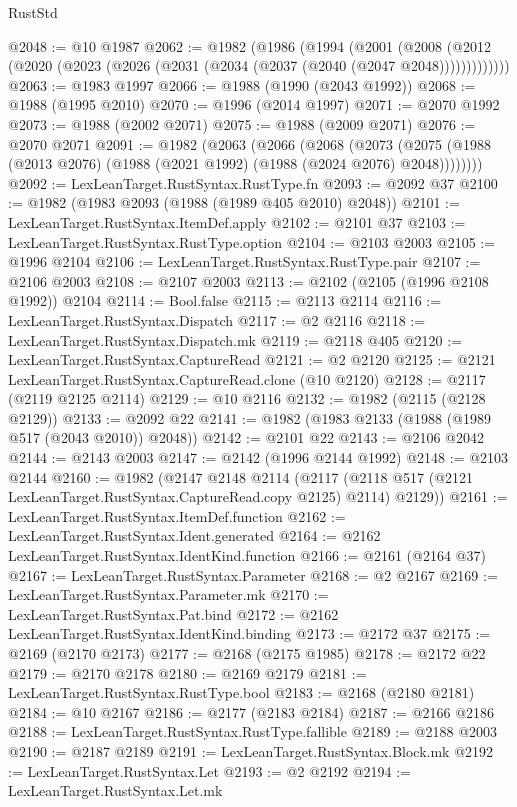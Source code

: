 \begin{lexlean}{RustStd}
\begin{coremodule}
{\begin{coremodule}
{{{{{{{{{{{{{{{{{{{{{{{{{{@2048 := @10 @1987
@2062 := @1982
    (@1986
      (@1994
        (@2001
          (@2008 (@2012 (@2020 (@2023 (@2026 (@2031 (@2034 (@2037 (@2040 (@2047 @2048)))))))))))))
@2063 := @1983 @1997
@2066 := @1988 (@1990 (@2043 @1992))
@2068 := @1988 (@1995 @2010)
@2070 := @1996 (@2014 @1997)
@2071 := @2070 @1992
@2073 := @1988 (@2002 @2071)
@2075 := @1988 (@2009 @2071)
@2076 := @2070 @2071
@2091 := @1982
    (@2063
      (@2066
        (@2068
          (@2073 (@2075 (@1988 (@2013 @2076) (@1988 (@2021 @1992) (@1988 (@2024 @2076) @2048))))))))
@2092 := LexLeanTarget.RustSyntax.RustType.fn
@2093 := @2092 @37
@2100 := @1982 (@1983 @2093 (@1988 (@1989 @405 @2010) @2048))
@2101 := LexLeanTarget.RustSyntax.ItemDef.apply
@2102 := @2101 @37
@2103 := LexLeanTarget.RustSyntax.RustType.option
@2104 := @2103 @2003
@2105 := @1996 @2104
@2106 := LexLeanTarget.RustSyntax.RustType.pair
@2107 := @2106 @2003
@2108 := @2107 @2003
@2113 := @2102 (@2105 (@1996 @2108 @1992)) @2104
@2114 := Bool.false
@2115 := @2113 @2114
@2116 := LexLeanTarget.RustSyntax.Dispatch
@2117 := @2 @2116
@2118 := LexLeanTarget.RustSyntax.Dispatch.mk
@2119 := @2118 @405
@2120 := LexLeanTarget.RustSyntax.CaptureRead
@2121 := @2 @2120
@2125 := @2121 LexLeanTarget.RustSyntax.CaptureRead.clone (@10 @2120)
@2128 := @2117 (@2119 @2125 @2114)
@2129 := @10 @2116
@2132 := @1982 (@2115 (@2128 @2129))
@2133 := @2092 @22
@2141 := @1982 (@1983 @2133 (@1988 (@1989 @517 (@2043 @2010)) @2048))
@2142 := @2101 @22
@2143 := @2106 @2042
@2144 := @2143 @2003
@2147 := @2142 (@1996 @2144 @1992)
@2148 := @2103 @2144
@2160 := @1982
    (@2147
      @2148
      @2114
      (@2117 (@2118 @517 (@2121 LexLeanTarget.RustSyntax.CaptureRead.copy @2125) @2114) @2129))
@2161 := LexLeanTarget.RustSyntax.ItemDef.function
@2162 := LexLeanTarget.RustSyntax.Ident.generated
@2164 := @2162 LexLeanTarget.RustSyntax.IdentKind.function
@2166 := @2161 (@2164 @37)
@2167 := LexLeanTarget.RustSyntax.Parameter
@2168 := @2 @2167
@2169 := LexLeanTarget.RustSyntax.Parameter.mk
@2170 := LexLeanTarget.RustSyntax.Pat.bind
@2172 := @2162 LexLeanTarget.RustSyntax.IdentKind.binding
@2173 := @2172 @37
@2175 := @2169 (@2170 @2173)
@2177 := @2168 (@2175 @1985)
@2178 := @2172 @22
@2179 := @2170 @2178
@2180 := @2169 @2179
@2181 := LexLeanTarget.RustSyntax.RustType.bool
@2183 := @2168 (@2180 @2181)
@2184 := @10 @2167
@2186 := @2177 (@2183 @2184)
@2187 := @2166 @2186
@2188 := LexLeanTarget.RustSyntax.RustType.fallible
@2189 := @2188 @2003
@2190 := @2187 @2189
@2191 := LexLeanTarget.RustSyntax.Block.mk
@2192 := LexLeanTarget.RustSyntax.Let
@2193 := @2 @2192
@2194 := LexLeanTarget.RustSyntax.Let.mk
}}}}}}}}}}}}}}}}}}}}}}}}}}
\end{coremodule}}
\end{coremodule}
\end{lexlean}
